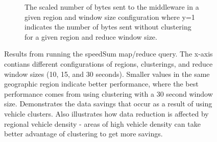 \documentclass{thesis}
\begin{document}
\begin{figure}
\begin{subfigure}[h]{0.45\textwidth}
            \caption{The scaled number of bytes sent to the middleware in a given region and window size
            configuration where y=1 indicates the number of bytes sent without clustering for a given region
            and reduce window size.}
        \end{subfigure}
        \caption{Results from running the speedSum map/reduce query. The x-axis contians different
            configurations of regions, clusterings, and reduce window sizes (10, 15, and 30 seconds). Smaller
            values in the same geographic region indicate better performance, where the best performance
            comes from using clustering with a 30 second window size. Demonstrates the data savings that occur as a result of using
            vehicle clusters. Also illustrates how data reduction is affected by regional vehicle
            density - areas of high vehicle density can take better advantage of clustering to get more savings.}
        \label{results:speedsum}
    \end{figure}
\end{document}
